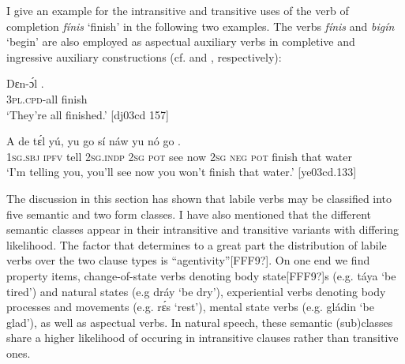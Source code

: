 I give an example for the intransitive and transitive uses of the verb of completion \textit{fínis} ‘finish’ in the following two examples. The verbs \textit{fínis} and \textit{bigín} ‘begin’ are also employed as aspectual auxiliary verbs in completive and ingressive auxiliary constructions (cf.  and , respectively):

\ea%
    \label{ex:key:1131}
    \gll Dɛn-ɔ́l      .\\
\textsc{3pl}.\textsc{cpd}{}-all  finish\\
\glt ‘They’re all finished.’ [dj03cd 157]
\z


\ea%
    \label{ex:key:1132}
    \gll A    de  tɛ́l  yú,    yu  go  sí  náw  
yu  nó  go        .\\
\textsc{1sg.sbj}  \textsc{ipfv}  tell  \textsc{2sg.indp}  \textsc{2sg}  \textsc{pot}  see  now  
\textsc{2sg}  \textsc{neg}  \textsc{pot}  finish  that    water\\

\glt ‘I’m telling you, you’ll see now you won’t finish that water.’ [ye03cd.133]
\z

The discussion in this section has shown that labile verbs may be classified into five semantic and two form classes. I have also mentioned that the different semantic classes appear in their intransitive and transitive variants with differing likelihood. The factor that determines to a great part the distribution of labile verbs over the two clause types is “agentivity”[FFF9?]. On one end we find property items, change-of-state verbs denoting body state[FFF9?]s (e.g. táya ‘be tired’) and natural states (e.g dráy ‘be dry’), experiential verbs denoting body processes and movements (e.g. rɛ́s ‘rest’), mental state verbs (e.g. gládin ‘be glad’), as well as aspectual verbs. In natural speech, these semantic (sub)classes share a higher likelihood of occuring in intransitive clauses rather than transitive ones. 


